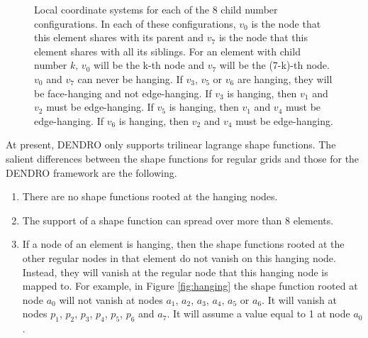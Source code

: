 \documentclass[12pt,reqno,a4paper]{report}
\numberwithin{equation}{section}
\begin{document}
\begin{figure}
  \begin{center} 
  \subfigure[Child 0]{  
   \label{fig:child0}
   } 
  \subfigure[Child 1]{
   \label{fig:child1}
   } 
  \subfigure[Child 2]{
   \label{fig:child2}
   } 
  \subfigure[Child 3 ]{
   \label{fig:child3}
   }     
  \subfigure[Child 4]{
   \label{fig:child4}
   } 
  \subfigure[Child 5]{
   \label{fig:child5}
   }
  \subfigure[Child 6]{
   \label{fig:child6}
   }
  \subfigure[Child 7]{
   \label{fig:child7}
   }
  \caption{Local coordinate systems for each of the 8 child number configurations. In each of these configurations, $v_0$ is the node that this element shares with its parent and $v_7$ is the node that this element shares with all its siblings. For an element with child number $k$, $v_0$ will be the k-th node and $v_7$ will be the (7-k)-th node. $v_0$ and $v_7$ can never be hanging. If $v_3$, $v_5$ or $v_6$ are hanging, they will be face-hanging and not edge-hanging. If $v_3$ is hanging, then $v_1$ and $v_2$ must be edge-hanging. If $v_5$ is hanging, then $v_1$ and $v_4$ must be edge-hanging. If $v_6$ is hanging, then $v_2$ and $v_4$ must be edge-hanging.} 
  \end {center}
\end{figure}

At present, DENDRO only supports trilinear lagrange shape functions. The salient differences between the shape functions for regular grids and those for the DENDRO framework are the following.
\begin{enumerate}
\item There are no shape functions rooted at the hanging nodes. 
\item The support of a shape function can spread over more than 8 elements.
\item If a node of an element is hanging, then the shape functions rooted at the other regular nodes in that element do not vanish on this hanging node. Instead, they will vanish at the regular node that this hanging node is mapped to. For example, in Figure \ref{fig:hanging} the shape function rooted at node $a_0$ will not vanish at nodes $a_1$, $a_2$, $a_3$, $a_4$, $a_5$ or $a_6$. It will vanish at nodes $p_1$, $p_2$, $p_3$, $p_4$, $p_5$, $p_6$ and $a_7$. It will assume a value equal to 1 at node $a_0$.
\end{enumerate}
\end{document}
